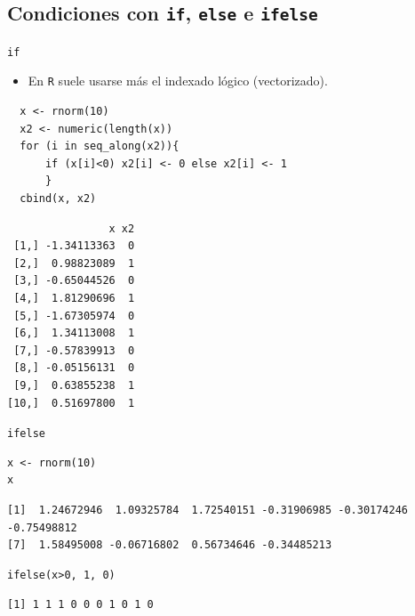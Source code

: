 \documentclass[xcolor={usenames,svgnames,dvipsnames}]{beamer}
\begin{document}
\subsection{Condiciones con \texttt{if}, \texttt{else} e \texttt{ifelse}}
\label{sec:orgheadline63}
\begin{frame}[fragile,label={sec:orgheadline61}]{\texttt{if}}
 \begin{itemize}
\item En \texttt{R} suele usarse más el indexado lógico (vectorizado).
\end{itemize}
\lstset{language=R,label= ,caption= ,captionpos=b,numbers=none}
\begin{lstlisting}
  x <- rnorm(10)
  x2 <- numeric(length(x))
  for (i in seq_along(x2)){
      if (x[i]<0) x2[i] <- 0 else x2[i] <- 1
      }
  cbind(x, x2)
\end{lstlisting}

\begin{verbatim}
                x x2
 [1,] -1.34113363  0
 [2,]  0.98823089  1
 [3,] -0.65044526  0
 [4,]  1.81290696  1
 [5,] -1.67305974  0
 [6,]  1.34113008  1
 [7,] -0.57839913  0
 [8,] -0.05156131  0
 [9,]  0.63855238  1
[10,]  0.51697800  1
\end{verbatim}
\end{frame}

\begin{frame}[fragile,label={sec:orgheadline62}]{\texttt{ifelse}}
 \lstset{language=R,label= ,caption= ,captionpos=b,numbers=none}
\begin{lstlisting}
x <- rnorm(10)
x
\end{lstlisting}

\begin{verbatim}
[1]  1.24672946  1.09325784  1.72540151 -0.31906985 -0.30174246 -0.75498812
[7]  1.58495008 -0.06716802  0.56734646 -0.34485213
\end{verbatim}

\lstset{language=R,label= ,caption= ,captionpos=b,numbers=none}
\begin{lstlisting}
ifelse(x>0, 1, 0)
\end{lstlisting}

\begin{verbatim}
[1] 1 1 1 0 0 0 1 0 1 0
\end{verbatim}
\end{frame}
\end{document}
